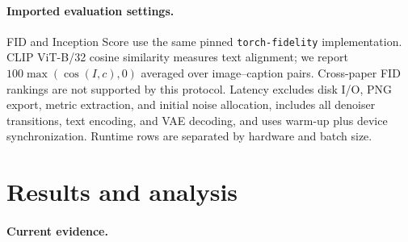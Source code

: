 \documentclass[10pt,twocolumn,letterpaper]{article}
\begin{document}
\paragraph{Imported evaluation settings.}

FID and Inception Score use the same pinned \texttt{torch-fidelity}
implementation. \ifStudySD CLIP ViT-B/32 cosine similarity measures text alignment;
we report $100\max(\cos(I,c),0)$ averaged over image--caption pairs.\fi{}
Cross-paper FID rankings are not supported by this protocol.
Latency excludes disk I/O, PNG export, metric extraction, and initial noise
allocation, includes all denoiser transitions\ifStudySD{}, text encoding, and VAE decoding\fi, and uses warm-up plus device
synchronization. Runtime rows are separated by hardware and batch size.

\section{Results and analysis}
\paragraph{Current evidence.}

\begin{table}[t]
 \centering\scriptsize
 \resizebox{\linewidth}{!}{}
 \caption{One-step student quality and teacher references under the shared protocol. Values with $\pm$ denote
 variation across training seeds. Single-seed rows do not establish robustness.}
 \label{tab:quality}
\end{table}
\begin{table}[t]
 \centering\scriptsize
 \resizebox{\linewidth}{!}{}
 \caption{Synchronized latency, grouped by actual hardware and batch size.
 Compare speed only within the same hardware and precision setting.}
 \label{tab:latency}
\end{table}
\begin{table}[t]
 \centering\scriptsize
 \resizebox{\linewidth}{!}{}
 \caption{Cumulative one-step training cost. G/F count generator/scorer updates;
 Pair NFE counts guided-teacher and reflow-teacher calls to build cached pairs. Hours include
 pair generation. Matching G does not match total compute.}
 \label{tab:cost}
\end{table}
\end{document}
